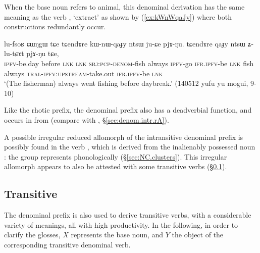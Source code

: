 When the base noun refers to animal, this denominal derivation has the same meaning as the verb , `extract' as shown by (\ref{ex:kWnWqaJy}) where both constructions redundantly occur.
 
\begin{exe}
\ex \label{ex:kWnWqaJy}
\gll lu-fsoʁ ɕɯŋgɯ tɕe tɕendɤre kɯ-nɯ-qaɟy ntsɯ ju-ɕe pjɤ-ŋu. tɕendɤre qaɟy ntsɯ ʑ-lu-tɕɤt pjɤ-ŋu tɕe, \\
\textsc{ipfv}-be.day before \textsc{lnk} \textsc{lnk} \textsc{sbj}:\textsc{pcp}-\textsc{denom}-fish always \textsc{ipfv}-go \textsc{ifr}.\textsc{ipfv}-be \textsc{lnk} fish always \textsc{tral}-\textsc{ipfv}:\textsc{upstream}-take.out \textsc{ifr}.\textsc{ipfv}-be  \textsc{lnk} \\
\glt `(The fisherman) always went fishing before daybreak.' (140512 yufu yu mogui, 9-10)
\end{exe}

Like the rhotic prefix, the  denominal prefix also has a deadverbial function, and occurs in  from  (compare with  , §\ref{sec:denom.intr.rA}).
  
A possible irregular reduced allomorph  of the intransitive denominal  prefix is possibly found in the verb , which is derived from the inalienably possessed noun : the group  represents  phonologically (§\ref{sec:NC.clusters}). This irregular allomorph appears to also be attested with some transitive verbs (§\ref{sec:denom.tr.nW}).

\subsection{Transitive}   \label{sec:denom.tr.nW}
The  denominal prefix is also used to derive transitive verbs, with a considerable variety of meanings, all with high productivity. In the following, in order to clarify the glosses, $X$ represents the base noun, and $Y$ the object of the corresponding transitive  denominal verb.

